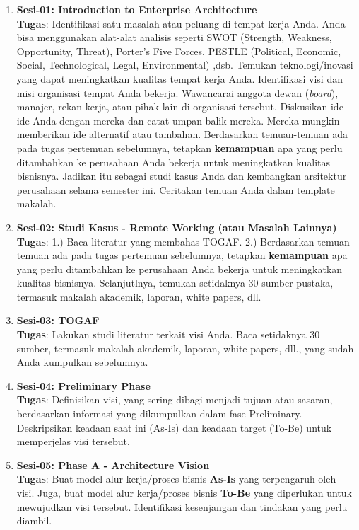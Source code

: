 \begin{enumerate}
	\item \textbf{Sesi-01: Introduction to Enterprise Architecture} \\
	\textbf{Tugas}: Identifikasi satu masalah atau peluang di tempat kerja Anda. Anda bisa menggunakan alat-alat analisis seperti SWOT (Strength, Weakness, Opportunity, Threat), Porter's Five Forces, PESTLE (Political, Economic, Social, Technological, Legal, Environmental) ,dsb. Temukan teknologi/inovasi yang dapat meningkatkan kualitas tempat kerja Anda. Identifikasi visi dan misi organisasi tempat Anda bekerja. Wawancarai anggota dewan (\textit{board}), manajer, rekan kerja, atau pihak lain di organisasi tersebut.  Diskusikan ide-ide Anda dengan mereka dan catat umpan balik mereka. Mereka mungkin memberikan ide alternatif atau tambahan. Berdasarkan temuan-temuan ada pada tugas pertemuan sebelumnya, tetapkan \textbf{kemampuan} apa yang perlu ditambahkan ke perusahaan Anda bekerja untuk meningkatkan kualitas bisnisnya. Jadikan itu sebagai studi kasus Anda dan kembangkan arsitektur perusahaan selama semester ini. Ceritakan temuan Anda dalam template makalah.
	
	
	\item \textbf{Sesi-02: Studi Kasus - Remote Working (atau Masalah Lainnya)} \\
	\textbf{Tugas}: 1.) Baca literatur yang membahas TOGAF. 2.) Berdasarkan temuan-temuan ada pada tugas pertemuan sebelumnya, tetapkan \textbf{kemampuan} apa yang perlu ditambahkan ke perusahaan Anda bekerja untuk meningkatkan kualitas bisnisnya. Selanjutlnya, temukan setidaknya 30 sumber pustaka, termasuk makalah akademik, laporan, white papers, dll.
	
	
	\item \textbf{Sesi-03: TOGAF} \\
	\textbf{Tugas}: Lakukan studi literatur terkait visi Anda. Baca setidaknya 30 sumber, termasuk makalah akademik, laporan, white papers, dll., yang sudah Anda kumpulkan sebelumnya.
	
	\item \textbf{Sesi-04: Preliminary Phase} \\
	\textbf{Tugas}: Definisikan visi, yang sering dibagi menjadi tujuan atau sasaran, berdasarkan informasi yang dikumpulkan dalam fase Preliminary. Deskripsikan keadaan saat ini (As-Is) dan keadaan target (To-Be) untuk memperjelas visi tersebut.
	
	\item \textbf{Sesi-05: Phase A - Architecture Vision} \\
	\textbf{Tugas}: Buat model alur kerja/proses bisnis \textbf{As-Is} yang terpengaruh oleh visi. Juga, buat model alur kerja/proses bisnis \textbf{To-Be} yang diperlukan untuk mewujudkan visi tersebut. Identifikasi kesenjangan dan tindakan yang perlu diambil.
	

\end{enumerate}
